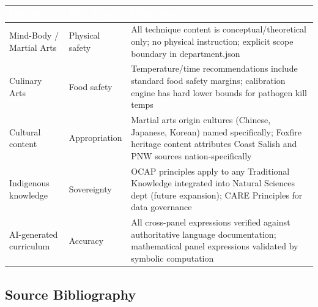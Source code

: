 \documentclass[11pt,letterpaper]{article}
\newcommand{\tableheader}[1]{\textbf{\sffamily\textcolor{white}{#1}}}
\begin{document}
\begin{center}
\begin{tabularx}{\textwidth}{L{3.5cm}L{2.5cm}X}
\toprule
{}
\tableheader{Domain} & \tableheader{Risk Type} & \tableheader{Mitigation} \\
\midrule
Mind-Body / Martial Arts & Physical safety & All technique content is conceptual/theoretical only; no physical instruction; explicit scope boundary in department.json \\
Culinary Arts & Food safety & Temperature/time recommendations include standard food safety margins; calibration engine has hard lower bounds for pathogen kill temps \\
Cultural content & Appropriation & Martial arts origin cultures (Chinese, Japanese, Korean) named specifically; Foxfire heritage content attributes Coast Salish and PNW sources nation-specifically \\
Indigenous knowledge & Sovereignty & OCAP principles apply to any Traditional Knowledge integrated into Natural Sciences dept (future expansion); CARE Principles for data governance \\
AI-generated curriculum & Accuracy & All cross-panel expressions verified against authoritative language documentation; mathematical panel expressions validated by symbolic computation \\
\bottomrule
\end{tabularx}
\end{center}

\subsection{Source Bibliography}
\end{document}
